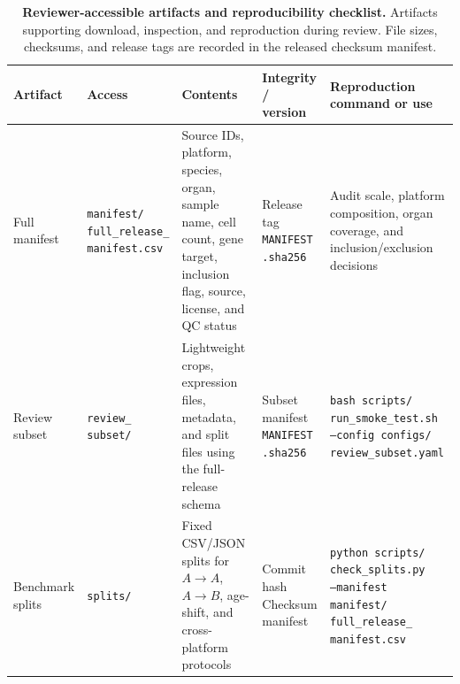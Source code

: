 \documentclass[sigconf,review]{acmart}
\begin{document}
\begin{table}[!t]
\centering
\scriptsize
\setlength{\tabcolsep}{2.4pt}
\renewcommand{\arraystretch}{0.98}
\setlength{\abovecaptionskip}{4pt}
\setlength{\belowcaptionskip}{3pt}

\caption{\textbf{Reviewer-accessible artifacts and reproducibility checklist.}
Artifacts supporting download, inspection, and reproduction during review. File sizes, checksums, and release tags are recorded in the released checksum manifest.}
\label{tab:S5_review_artifact_checklist}

\begin{tabularx}{\textwidth}{
>{\raggedright\arraybackslash}p{1.75cm}
>{\raggedright\arraybackslash}p{2.15cm}
>{\raggedright\arraybackslash}X
>{\raggedright\arraybackslash}p{2.05cm}
>{\raggedright\arraybackslash}X
}
\toprule
\textbf{Artifact} &
\textbf{Access} &
\textbf{Contents} &
\textbf{Integrity / version} &
\textbf{Reproduction command or use} \\
\midrule

Full manifest &
\makecell[l]{\texttt{manifest/}\\
\texttt{full\_release\_}\\
\texttt{manifest.csv}} &
Source IDs, platform, species, organ, sample name, cell count, gene target, inclusion flag, source, license, and QC status &
\makecell[l]{Release tag\\
\texttt{MANIFEST}\\
\texttt{.sha256}} &
Audit scale, platform composition, organ coverage, and inclusion/exclusion decisions \\

Review subset &
\makecell[l]{\texttt{review\_}\\
\texttt{subset/}} &
Lightweight crops, expression files, metadata, and split files using the full-release schema &
\makecell[l]{Subset manifest\\
\texttt{MANIFEST}\\
\texttt{.sha256}} &
\makecell[l]{\texttt{bash scripts/}\\
\texttt{run\_smoke\_test.sh}\\
\texttt{--config configs/}\\
\texttt{review\_subset.yaml}} \\

Benchmark splits &
\texttt{splits/} &
Fixed CSV/JSON splits for $A\!\to\!A$, $A\!\to\!B$, age-shift, and cross-platform protocols &
\makecell[l]{Commit hash\\
Checksum\\
manifest} &
\makecell[l]{\texttt{python scripts/}\\
\texttt{check\_splits.py}\\
\texttt{--manifest manifest/}\\
\texttt{full\_release\_}\\
\texttt{manifest.csv}} \\


\end{tabularx}
\end{table}
\end{document}
